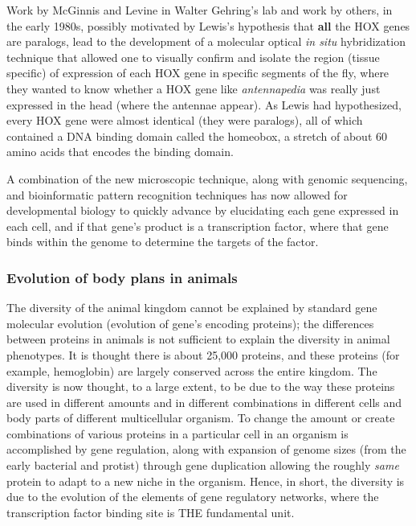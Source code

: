  Work by McGinnis and Levine in Walter Gehring's lab and work by others, in the early 1980s, possibly motivated by Lewis's hypothesis that \textbf{all} the HOX genes are paralogs, lead to the development of a molecular optical \textit{in situ} hybridization technique that allowed one to visually confirm and isolate the region (tissue specific) of expression of each HOX gene in specific segments of the fly, where they wanted to know whether a HOX gene like \textit{antennapedia} was really just expressed in the head (where the antennae appear)\cite{pmid6323992}.  As Lewis had hypothesized, every HOX gene were almost identical (they were paralogs), all of which contained a DNA binding domain called the homeobox, a stretch of about 60 amino acids that encodes the binding domain.

A combination of the new microscopic technique, along with genomic sequencing, and bioinformatic pattern recognition techniques has now allowed for developmental biology to quickly advance by elucidating each gene expressed in each cell, and if that gene's product is a transcription factor, where that gene binds within the genome to determine the targets of the factor.

 

\subsubsection{Evolution of body plans in animals}

The diversity of the animal kingdom cannot be explained by standard gene molecular evolution (evolution of gene's encoding proteins); the differences between proteins in animals is not sufficient to explain the diversity in animal phenotypes\cite{pmid1090005}.  It is thought there is about 25,000 proteins, and these proteins (for example, hemoglobin) are largely conserved across the entire kingdom.  The diversity is now thought, to a large extent, to be due to the way these proteins are used in different amounts and in different combinations in different cells and body parts of different multicellular organism.  To change the amount or create combinations of various proteins in a particular cell in an organism is accomplished by gene regulation, along with expansion of genome sizes (from the early bacterial and protist) through gene duplication allowing the roughly \textit{same} protein to adapt to a new niche in the organism.  Hence, in short, the diversity is due to the evolution of the elements of gene regulatory networks, where the transcription factor binding site is THE fundamental unit.

